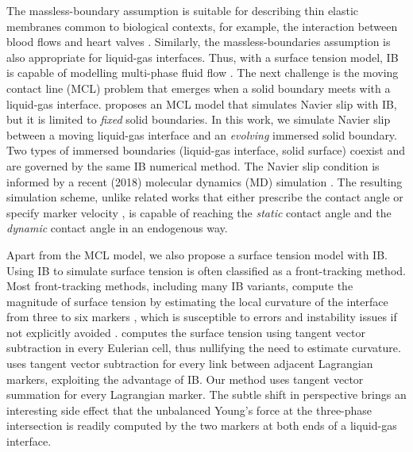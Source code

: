 \documentclass{jfm}
\begin{document}
The massless-boundary assumption is suitable for describing thin elastic membranes common to biological contexts, for example, the interaction between blood flows and heart valves \cite{peskin1972flow}. Similarly, the massless-boundaries assumption is also appropriate for liquid-gas interfaces. Thus, with a surface tension model, IB is capable of modelling multi-phase fluid flow \cite{surface_tension_review, surface_tension_IB_estimates_curvature, multi_phase_2018, assessment_VOF_vs_IB}. The next challenge is the moving contact line (MCL) problem that emerges when a solid boundary meets with a liquid-gas interface. \cite{MCL_IBM_surfactant} proposes an MCL model that simulates Navier slip with IB, but it is limited to \textit{fixed} solid boundaries. In this work, we simulate Navier slip between a moving liquid-gas interface and an \textit{evolving} immersed solid boundary. Two types of immersed boundaries (liquid-gas interface, solid surface) coexist and are governed by the same IB numerical method. The Navier slip condition is informed by a recent (2018) molecular dynamics (MD) simulation \cite{MD_2018_its_the_bonds}. The resulting simulation scheme, unlike related works that either prescribe the contact angle \cite{curved_solid_DI_IB, muradoglu2010front} or specify marker velocity \cite{manservisi2009variational}, is capable of reaching the \textit{static} contact angle and the \textit{dynamic} contact angle in an endogenous way. 

Apart from the MCL model, we also propose a surface tension model with IB. Using IB to simulate surface tension is often classified as a front-tracking method. Most front-tracking methods, including many IB variants, compute the magnitude of surface tension by estimating the local curvature of the interface from three to six markers \cite{surface_tension_IB_estimates_curvature, multi_phase_2018}, which is susceptible to errors and instability issues if not explicitly avoided \cite{assessment_VOF_vs_IB}. \cite{surface_tension_still_tangent_applied_to_segment} computes the surface tension using tangent vector subtraction in every Eulerian cell, thus nullifying the need to estimate curvature. \cite{eulerian_tension_lagrangian_advection} uses tangent vector subtraction for every link between adjacent Lagrangian markers, exploiting the advantage of IB. Our method uses tangent vector summation for every Lagrangian marker. The subtle shift in perspective brings an interesting side effect that the unbalanced Young's force at the three-phase intersection is readily computed by the two markers at both ends of a liquid-gas interface. 
\end{document}
